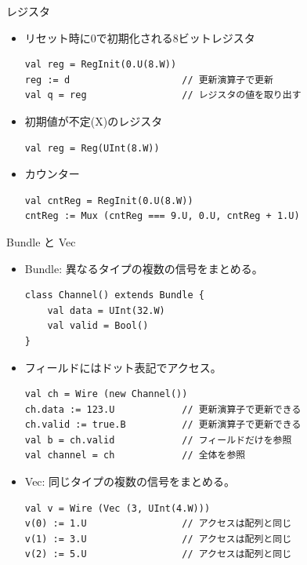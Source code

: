 \begin{frame}[fragile]{レジスタ}
    \begin{itemize}
        \item リセット時に0で初期化される8ビットレジスタ
        \begin{lstlisting}
val reg = RegInit(0.U(8.W))
reg := d                    // 更新演算子で更新
val q = reg                 // レジスタの値を取り出す
        \end{lstlisting}
        
        \item 初期値が不定(X)のレジスタ
        \begin{lstlisting}
val reg = Reg(UInt(8.W))
        \end{lstlisting}
        
        \item カウンター
        \begin{lstlisting}
val cntReg = RegInit(0.U(8.W))
cntReg := Mux (cntReg === 9.U, 0.U, cntReg + 1.U)
        \end{lstlisting}
    \end{itemize}
    
\end{frame}



\begin{frame}[fragile]{Bundle と Vec}
    \begin{itemize}
        \item Bundle: 異なるタイプの複数の信号をまとめる。
        \begin{lstlisting}
class Channel() extends Bundle {
    val data = UInt(32.W)
    val valid = Bool()
}
        \end{lstlisting}
        
        \item フィールドにはドット表記でアクセス。
        \begin{lstlisting}
val ch = Wire (new Channel())
ch.data := 123.U            // 更新演算子で更新できる
ch.valid := true.B          // 更新演算子で更新できる
val b = ch.valid            // フィールドだけを参照
val channel = ch            // 全体を参照
        \end{lstlisting}
        
        \item Vec: 同じタイプの複数の信号をまとめる。
        \begin{lstlisting}
val v = Wire (Vec (3, UInt(4.W)))
v(0) := 1.U                 // アクセスは配列と同じ
v(1) := 3.U                 // アクセスは配列と同じ
v(2) := 5.U                 // アクセスは配列と同じ
        \end{lstlisting}
    \end{itemize}
    
\end{frame}




